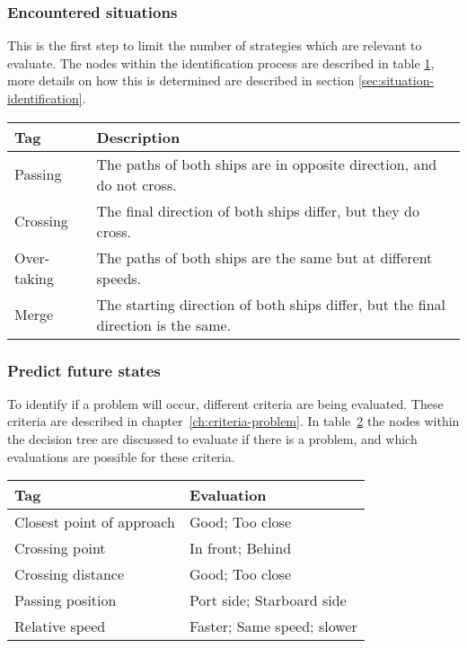 \subsubsection{Encountered situations}
This is the first step to limit the number of strategies which are relevant to evaluate. The nodes within the identification process are described in table \ref{tab:situations}, more details on how this is determined are described in section \ref{sec:situation-identification}.
\begin{table}[H]
	\begin{tabular}{p{}|p{}}
		\toprule
		Tag & Description\\
		\midrule
		Passing & The paths of both ships are in opposite direction, and do not cross. \\
		Crossing & The final direction of both ships differ, but they do cross. \\
		Over-taking & The paths of both ships are the same but at different speeds. \\
		Merge & The starting direction of both ships differ, but the final direction is the same. \\
		\bottomrule
	\end{tabular}
	
	\label{tab:situations}
\end{table}

\subsubsection{Predict future states}
To identify if a problem will occur, different criteria are being evaluated. These criteria are described in chapter~\ref{ch:criteria-problem}. In table~\ref{tab:identification-criteria} the nodes within the decision tree are discussed to evaluate if there is a problem, and which evaluations are possible for these criteria. 
\begin{table}[H]
	\begin{tabular}{p{}|p{}}
		\toprule
		Tag & Evaluation \\
		\midrule
		Closest point of approach & Good; Too close \\
		Crossing point & In front; Behind \\
		Crossing distance & Good; Too close \\
		Passing position & Port side; Starboard side \\
		Relative speed & Faster; Same speed; slower \\
		\bottomrule
	\end{tabular}
	
	\label{tab:identification-criteria}
\end{table}

